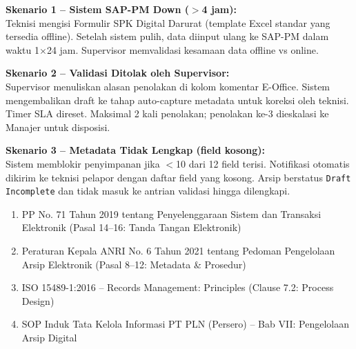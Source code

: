 \documentclass[12pt,a4paper]{report}
\begin{document}
\begin{tcolorbox}[colback=plnorange!5, colframe=plnorange!50, sharp corners, title={\small\bfseries Komponen 6: Exception Handling \& Fallback}]
\small
\noindent\textbf{Skenario 1 -- Sistem SAP-PM Down ($>$4 jam):}\\
Teknisi mengisi Formulir SPK Digital Darurat (template Excel standar yang tersedia offline). Setelah sistem pulih, data diinput ulang ke SAP-PM dalam waktu 1$\times$24 jam. Supervisor memvalidasi kesamaan data offline vs online.

\vspace{0.3cm}
\noindent\textbf{Skenario 2 -- Validasi Ditolak oleh Supervisor:}\\
Supervisor menuliskan alasan penolakan di kolom komentar E-Office. Sistem mengembalikan draft ke tahap auto-capture metadata untuk koreksi oleh teknisi. Timer SLA direset. Maksimal 2 kali penolakan; penolakan ke-3 dieskalasi ke Manajer untuk disposisi.

\vspace{0.3cm}
\noindent\textbf{Skenario 3 -- Metadata Tidak Lengkap (field kosong):}\\
Sistem memblokir penyimpanan jika $<$10 dari 12 field terisi. Notifikasi otomatis dikirim ke teknisi pelapor dengan daftar field yang kosong. Arsip berstatus \texttt{Draft Incomplete} dan tidak masuk ke antrian validasi hingga dilengkapi.
\end{tcolorbox}

\begin{tcolorbox}[colback=fillgreen, colframe=plnblue!50, sharp corners, title={\small\bfseries Komponen 7: Referensi Regulasi \& Standar}]
\small
\begin{enumerate}
    \item PP No. 71 Tahun 2019 tentang Penyelenggaraan Sistem dan Transaksi Elektronik (Pasal 14--16: Tanda Tangan Elektronik)
    \item Peraturan Kepala ANRI No. 6 Tahun 2021 tentang Pedoman Pengelolaan Arsip Elektronik (Pasal 8--12: Metadata \& Prosedur)
    \item ISO 15489-1:2016 -- Records Management: Principles (Clause 7.2: Process Design)
    \item SOP Induk Tata Kelola Informasi PT PLN (Persero) -- Bab VII: Pengelolaan Arsip Digital
\end{enumerate}
\end{tcolorbox}

\vspace{0.2cm}
\end{document}
